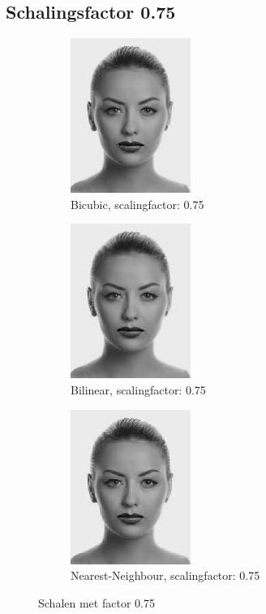\documentclass{article}
\begin{document}
\clearpage
\subsection{Schalingsfactor 0.75}

\begin{figure}[H]
\centering
    \begin{subfigure}{.5\textwidth}
      \centering
      \includegraphics[]{assets/Bicubic_Female_075.png}
      \caption{Bicubic, scalingfactor: 0.75}
      \label{fig:sub1}
    \end{subfigure}%
    \begin{subfigure}{.5\textwidth}
      \centering
      \includegraphics[]{assets/Bilinear_Female_075.png}
      \caption{Bilinear, scalingfactor: 0.75}
      \label{fig:sub2}
    \end{subfigure}
    \begin{subfigure}{.5\textwidth}
      \centering
      \includegraphics[]{assets/Nearest_Female_075.png}
      \caption{Nearest-Neighbour, scalingfactor: 0.75}
      \label{fig:sub3}
    \end{subfigure}
    \caption{Schalen met factor 0.75}
    \label{fig:test}
\end{figure}
\end{document}
